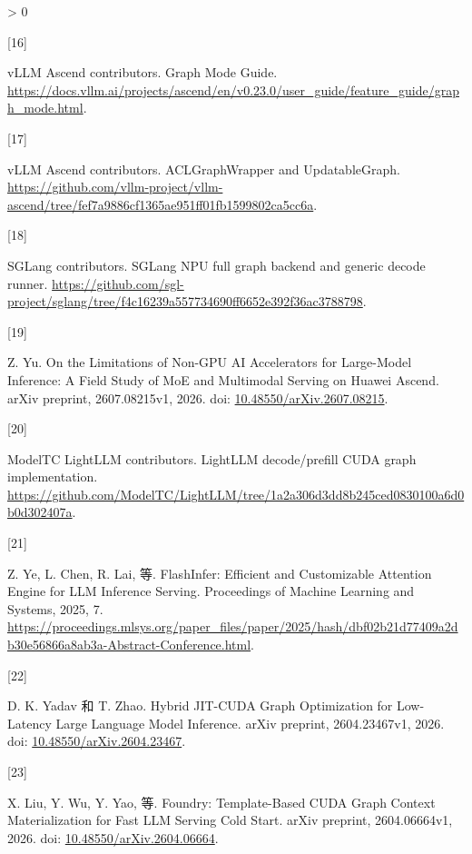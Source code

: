 \documentclass[
  UTF8,
  zihao=5]{ctexart}
\newlength{\cslhangindent}
\newlength{\csllabelwidth}
\newenvironment{CSLReferences}[2] %
 {%
  \setlength{\parindent}{0pt}
  \ifodd #1 \everypar{\setlength{\hangindent}{\cslhangindent}}\ignorespaces\fi
  \ifnum #2 > 0
  \setlength{\parskip}{#2\baselineskip}
  \fi
 }%
 {}
\newcommand{\CSLLeftMargin}[1]{\parbox[t]{\csllabelwidth}{#1}}
\newcommand{\CSLRightInline}[1]{\parbox[t]{\linewidth - \csllabelwidth}{#1}\par}
\begin{document}
\begin{CSLReferences}{0}{0}
\leavevmode{}%
\CSLLeftMargin{{[}16{]} }%
\CSLRightInline{vLLM Ascend contributors. {Graph Mode Guide}.
\url{https://docs.vllm.ai/projects/ascend/en/v0.23.0/user_guide/feature_guide/graph_mode.html}.}

\leavevmode{}%
\CSLLeftMargin{{[}17{]} }%
\CSLRightInline{vLLM Ascend contributors. {ACLGraphWrapper and
UpdatableGraph}.
\url{https://github.com/vllm-project/vllm-ascend/tree/fef7a9886cf1365ae951ff01fb1599802ca5cc6a}.}

\leavevmode{}%
\CSLLeftMargin{{[}18{]} }%
\CSLRightInline{SGLang contributors. {SGLang NPU full graph backend and
generic decode runner}.
\url{https://github.com/sgl-project/sglang/tree/f4c16239a557734690ff6652e392f36ac3788798}.}

\leavevmode{}%
\CSLLeftMargin{{[}19{]} }%
\CSLRightInline{Z. Yu. {On the Limitations of Non-GPU AI Accelerators
for Large-Model Inference: A Field Study of MoE and Multimodal Serving
on Huawei Ascend}. arXiv preprint, 2607.08215v1, 2026. doi:
\href{https://doi.org/10.48550/arXiv.2607.08215}{10.48550/arXiv.2607.08215}.}

\leavevmode{}%
\CSLLeftMargin{{[}20{]} }%
\CSLRightInline{ModelTC LightLLM contributors. {LightLLM decode/prefill
CUDA graph implementation}.
\url{https://github.com/ModelTC/LightLLM/tree/1a2a306d3dd8b245ced0830100a6d0b0d302407a}.}

\leavevmode{}%
\CSLLeftMargin{{[}21{]} }%
\CSLRightInline{Z. Ye, L. Chen, R. Lai, 等. {FlashInfer: Efficient and
Customizable Attention Engine for LLM Inference Serving}. Proceedings of
Machine Learning and Systems, 2025, 7.
\url{https://proceedings.mlsys.org/paper_files/paper/2025/hash/dbf02b21d77409a2db30e56866a8ab3a-Abstract-Conference.html}.}

\leavevmode{}%
\CSLLeftMargin{{[}22{]} }%
\CSLRightInline{D. K. Yadav 和 T. Zhao. {Hybrid JIT-CUDA Graph
Optimization for Low-Latency Large Language Model Inference}. arXiv
preprint, 2604.23467v1, 2026. doi:
\href{https://doi.org/10.48550/arXiv.2604.23467}{10.48550/arXiv.2604.23467}.}

\leavevmode{}%
\CSLLeftMargin{{[}23{]} }%
\CSLRightInline{X. Liu, Y. Wu, Y. Yao, 等. Foundry: Template-Based CUDA
Graph Context Materialization for Fast LLM Serving Cold Start. arXiv
preprint, 2604.06664v1, 2026. doi:
\href{https://doi.org/10.48550/arXiv.2604.06664}{10.48550/arXiv.2604.06664}.}


\end{CSLReferences}
\end{document}
